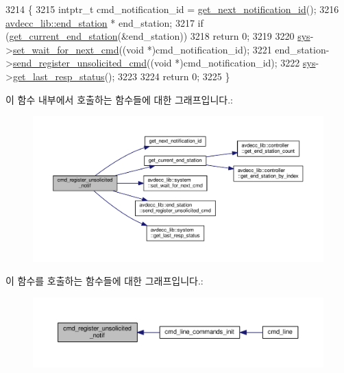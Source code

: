\begin{DoxyCode}
3214 \{
3215     intptr\_t cmd\_notification\_id = \hyperlink{classcmd__line_a57486218387d1aa9d262eb7c176154ad}{get\_next\_notification\_id}();
3216     \hyperlink{classavdecc__lib_1_1end__station}{avdecc\_lib::end\_station} * end\_station;
3217     \textcolor{keywordflow}{if} (\hyperlink{classcmd__line_aa7ddf8d9fbcf5d1c6c5f329bc850418c}{get\_current\_end\_station}(&end\_station))
3218         \textcolor{keywordflow}{return} 0;
3219 
3220     \hyperlink{classcmd__line_a485db4800e331cb4052c447fdf5d154e}{sys}->\hyperlink{classavdecc__lib_1_1system_a26b769584f10225077da47583edda33e}{set\_wait\_for\_next\_cmd}((\textcolor{keywordtype}{void} *)cmd\_notification\_id);
3221     end\_station->\hyperlink{classavdecc__lib_1_1end__station_a6cbbd31a079f28038babf5fec3fceca5}{send\_register\_unsolicited\_cmd}((\textcolor{keywordtype}{void} *)cmd\_notification\_id);
3222     \hyperlink{classcmd__line_a485db4800e331cb4052c447fdf5d154e}{sys}->\hyperlink{classavdecc__lib_1_1system_aa63e8d1a4e51f695cdcccc9340922407}{get\_last\_resp\_status}();
3223 
3224     \textcolor{keywordflow}{return} 0;
3225 \}
\end{DoxyCode}


이 함수 내부에서 호출하는 함수들에 대한 그래프입니다.\+:
\nopagebreak
\begin{figure}[H]
\begin{center}
\leavevmode
\includegraphics[width=350pt]{classcmd__line_a8e9f80a8fd0c927d8b6500d1d5b9f797_cgraph}
\end{center}
\end{figure}




이 함수를 호출하는 함수들에 대한 그래프입니다.\+:
\nopagebreak
\begin{figure}[H]
\begin{center}
\leavevmode
\includegraphics[width=350pt]{classcmd__line_a8e9f80a8fd0c927d8b6500d1d5b9f797_icgraph}
\end{center}
\end{figure}


